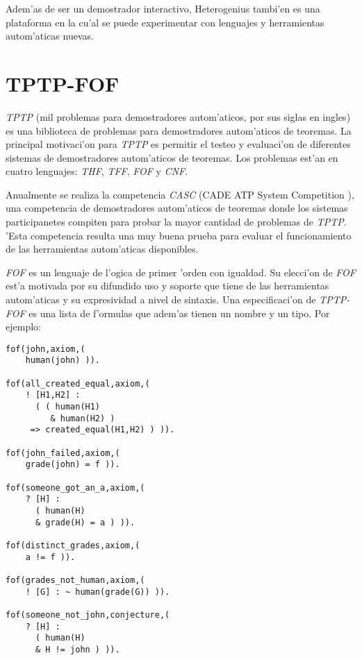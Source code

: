 Adem'as de ser un demostrador interactivo, Heterogenius tambi'en es una plataforma en la cu'al se puede experimentar con lenguajes y herramientas autom'aticas nuevas.


\section{TPTP-FOF}

\textit{TPTP} (mil problemas para demostradores autom'aticos, por sus siglas en ingles) \cite{tptp} es una biblioteca de problemas para demostradores autom'aticos de teoremas. La principal motivaci'on para \textit{TPTP} es permitir el testeo y evaluaci'on de diferentes sistemas de demostradores autom'aticos de teoremas. Los problemas est'an en cuatro lenguajes: \textit{THF}, \textit{TFF}, \textit{FOF} y \textit{CNF}.

Anualmente se realiza la competencia \textit{CASC} (CADE ATP System Competition \cite{casc}), una competencia de demostradores autom'aticos de teoremas donde los sistemas participanetes compiten para probar la mayor cantidad de problemas de \textit{TPTP}. 'Esta competencia resulta una muy buena prueba para evaluar el funcionamiento de las herramientas autom'aticas disponibles.

\textit{FOF} \cite{fof} es un lenguaje de l'ogica de primer 'orden con igualdad. Su elecci'on de \textit{FOF} est'a motivada  por su difundido uso y soporte que tiene de las herramientas autom'aticas y su expresividad a nivel de sintaxis. Una especificaci'on de \textit{TPTP-FOF} es una lista de f'ormulas que adem'as tienen un nombre y un tipo. Por ejemplo:

\begin{verbatim}
fof(john,axiom,( 
    human(john) )).

fof(all_created_equal,axiom,( 
    ! [H1,H2] : 
      ( ( human(H1) 
         & human(H2) ) 
     => created_equal(H1,H2) ) )). 

fof(john_failed,axiom,( 
    grade(john) = f )). 

fof(someone_got_an_a,axiom,( 
    ? [H] : 
      ( human(H) 
      & grade(H) = a ) )). 

fof(distinct_grades,axiom,( 
    a != f )). 

fof(grades_not_human,axiom,( 
    ! [G] : ~ human(grade(G)) )). 

fof(someone_not_john,conjecture,( 
    ? [H] : 
      ( human(H) 
      & H != john ) )). 
\end{verbatim}


